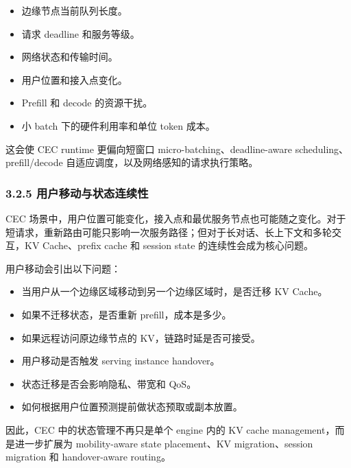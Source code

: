 \documentclass[a4paper,10pt]{ctexart}
\begin{document}
\begin{itemize}
\item 边缘节点当前队列长度。

\item 请求 deadline 和服务等级。

\item 网络状态和传输时间。

\item 用户位置和接入点变化。

\item Prefill 和 decode 的资源干扰。

\item 小 batch 下的硬件利用率和单位 token 成本。



\end{itemize}
这会使 CEC runtime 更偏向短窗口 micro-batching、deadline-aware scheduling、prefill/decode 自适应调度，以及网络感知的请求执行策略。








\subsubsection*{3.2.5 用户移动与状态连续性}



CEC 场景中，用户位置可能变化，接入点和最优服务节点也可能随之变化。对于短请求，重新路由可能只影响一次服务路径；但对于长对话、长上下文和多轮交互，KV Cache、prefix cache 和 session state 的连续性会成为核心问题。




用户移动会引出以下问题：




\begin{itemize}
\item 当用户从一个边缘区域移动到另一个边缘区域时，是否迁移 KV Cache。

\item 如果不迁移状态，是否重新 prefill，成本是多少。

\item 如果远程访问原边缘节点的 KV，链路时延是否可接受。

\item 用户移动是否触发 serving instance handover。

\item 状态迁移是否会影响隐私、带宽和 QoS。

\item 如何根据用户位置预测提前做状态预取或副本放置。



\end{itemize}
因此，CEC 中的状态管理不再只是单个 engine 内的 KV cache management，而是进一步扩展为 mobility-aware state placement、KV migration、session migration 和 handover-aware routing。
\end{document}
